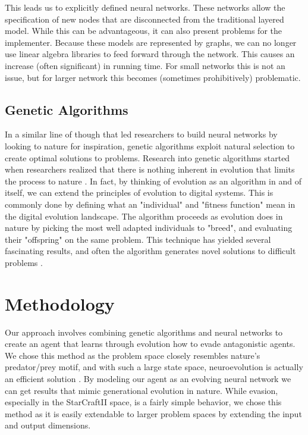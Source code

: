 \documentclass{article}
\begin{document}
This leads us to explicitly defined neural networks. These networks allow the
specification of new nodes that are disconnected from the traditional layered
model. While this can be advantageous, it can also present problems for the
implementer. Because these models are represented by graphs, we can no longer
use linear algebra libraries to feed forward through the network. This causes
an increase (often significant) in running time. For small networks this is
not an issue, but for larger network this becomes (sometimes prohibitively)
problematic.

\subsection{Genetic Algorithms}
In a similar line of though that led researchers to build neural networks by
looking to nature for inspiration, genetic algorithms exploit natural selection
to create optimal solutions to problems. Research into genetic algorithms
started when researchers realized that there is nothing inherent in evolution
that limits the process to nature \cite{dejong}. In fact, by thinking of
evolution as an algorithm in and of itself, we can extend the principles of
evolution to
digital systems. This is commonly done by defining what an "individual" and
"fitness function" mean in the digital evolution landscape. The algorithm
proceeds as evolution does in nature by picking the most well adapted
individuals to "breed", and evaluating their "offspring" on the same problem.
This technique has yielded several fascinating results, and often the
algorithm generates novel solutions to difficult problems \cite{lehman}.

\section{Methodology}
Our approach involves combining genetic algorithms and neural networks to
create an agent that learns through evolution how to evade antagonistic
agents. We chose this method as the problem space closely resembles nature's
predator/prey motif, and with such a large state space, neuroevolution is
actually an efficient solution \cite{NEAT}. By modeling our agent as an
evolving neural network we can
get results that mimic generational evolution in nature. While evasion,
especially in the StarCraftII space, is a fairly simple behavior, we chose this
method as it is easily extendable to larger problem spaces by extending the
input and output dimensions.
\end{document}
